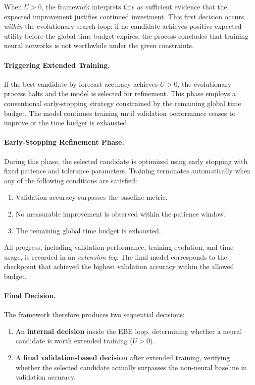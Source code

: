 \documentclass[stu,12pt,floatsintext,doublespacing]{apa7}
\begin{document}
When $U > 0$, the framework interprets this as sufficient evidence that the expected improvement justifies continued investment. This first decision occurs \textit{within} the evolutionary search loop: if no candidate achieves positive expected utility before the global time budget expires, the process concludes that training neural networks is not worthwhile under the given constraints.

\paragraph{Triggering Extended Training.}
If the best candidate by forecast accuracy achieves $U > 0$, the evolutionary process halts and the model is selected for refinement. This phase employs a conventional early-stopping strategy constrained by the remaining global time budget. The model continues training until validation performance ceases to improve or the time budget is exhausted.

\paragraph{Early-Stopping Refinement Phase.}
During this phase, the selected candidate is optimized using early stopping with fixed patience and tolerance parameters. Training terminates automatically when any of the following conditions are satisfied:
\begin{enumerate}
    \item Validation accuracy surpasses the baseline metric.
    \item No measurable improvement is observed within the patience window.
    \item The remaining global time budget is exhausted.
\end{enumerate}
All progress, including validation performance, training evolution, and time usage, is recorded in an \textit{extension log}. The final model corresponds to the checkpoint that achieved the highest validation accuracy within the allowed budget.

\paragraph{Final Decision.}
The framework therefore produces two sequential decisions:
\begin{enumerate}
    \item An \textbf{internal decision} inside the EBE loop, determining whether a neural candidate is worth extended training ($U > 0$).
    \item A \textbf{final validation-based decision} after extended training, verifying whether the selected candidate actually surpasses the non-neural baseline in validation accuracy.
\end{enumerate}
\end{document}
